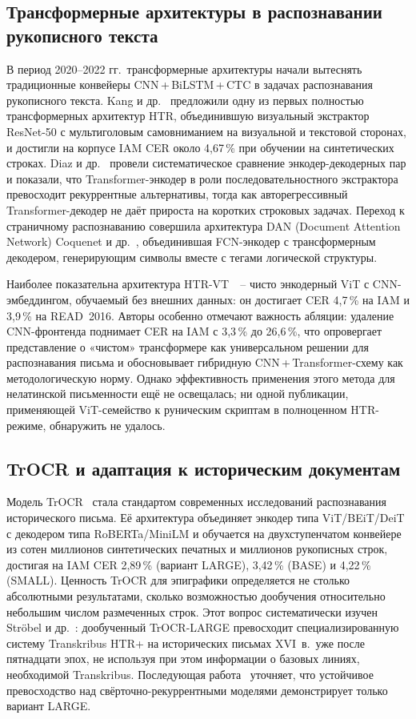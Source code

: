 \documentclass[a4paper,12pt]{extarticle}
\begin{document}
\subsection{Трансформерные архитектуры в распознавании рукописного текста}
\label{sec:lit-htr}

В период 2020--2022 гг.\ трансформерные архитектуры начали вытеснять традиционные конвейеры CNN\,+\,BiLSTM\,+\,CTC в задачах распознавания рукописного текста. Kang и др.~\cite{kang2022} предложили одну из первых полностью трансформерных архитектур HTR, объединившую визуальный экстрактор ResNet-50 с мультиголовым самовниманием на визуальной и текстовой сторонах, и достигли на корпусе IAM CER около 4,67\,\% при обучении на синтетических строках. Diaz и др.~\cite{diaz2021} провели систематическое сравнение энкодер-декодерных пар и показали, что Transformer-энкодер в роли последовательностного экстрактора превосходит рекуррентные альтернативы, тогда как авторегрессивный Transformer-декодер не даёт прироста на коротких строковых задачах. Переход к страничному распознаванию совершила архитектура DAN (Document Attention Network) Coquenet и др.~\cite{coquenet2023}, объединившая FCN-энкодер с трансформерным декодером, генерирующим символы вместе с тегами логической структуры.

Наиболее показательна архитектура HTR-VT~\cite{li2025htrvt}~-- чисто энкодерный ViT с CNN-эмбеддингом, обучаемый без внешних данных: он достигает CER 4,7\,\% на IAM и 3,9\,\% на READ~2016. Авторы особенно отмечают важность абляции: удаление CNN-фронтенда поднимает CER на IAM с 3,3\,\% до 26,6\,\%, что опровергает представление о «чистом» трансформере как универсальном решении для распознавания письма и обосновывает гибридную CNN\,+\,Transformer-схему как методологическую норму. Однако эффективность применения этого метода для нелатинской письменности ещё не освещалась; ни одной публикации, применяющей ViT-семейство к руническим скриптам в полноценном HTR-режиме, обнаружить не удалось.

\subsection{TrOCR и адаптация к историческим документам}
\label{sec:lit-trocr}

Модель TrOCR~\cite{li2023} стала стандартом современных исследований распознавания исторического письма. Её архитектура объединяет энкодер типа ViT/BEiT/DeiT с декодером типа RoBERTa/MiniLM и обучается на двухступенчатом конвейере из сотен миллионов синтетических печатных и миллионов рукописных строк, достигая на IAM CER 2,89\,\% (вариант LARGE), 3,42\,\% (BASE) и 4,22\,\% (SMALL). Ценность TrOCR для эпиграфики определяется не столько абсолютными результатами, сколько возможностью дообучения относительно небольшим числом размеченных строк. Этот вопрос систематически изучен Ströbel и др.~\cite{strobel2022}: дообученный TrOCR-LARGE превосходит специализированную систему Transkribus HTR+ на исторических письмах XVI~в.\ уже после пятнадцати эпох, не используя при этом информации о базовых линиях, необходимой Transkribus. Последующая работа~\cite{strobel2023} уточняет, что устойчивое превосходство над свёрточно-рекуррентными моделями демонстрирует только вариант LARGE.
\end{document}
